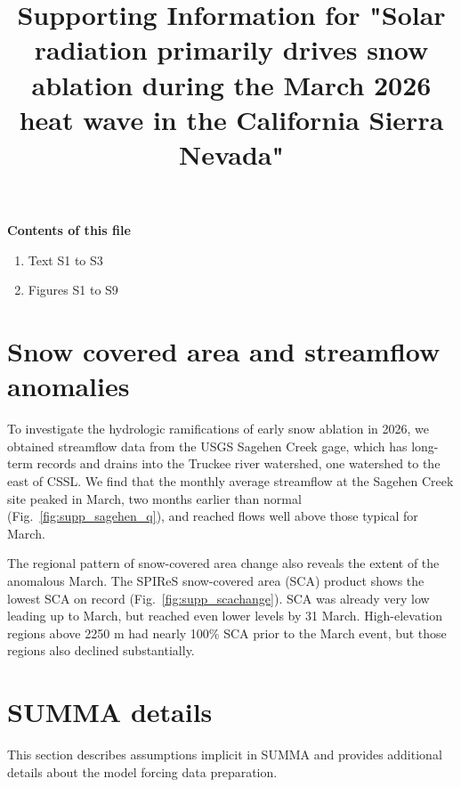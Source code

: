 \documentclass[draft,jgrga]{agutexSI2019}
\begin{document}
\title{Supporting Information for "Solar radiation primarily drives snow ablation during the March 2026 heat wave in the California Sierra Nevada"}



\begin{article}

\noindent\textbf{Contents of this file}
\begin{enumerate}
\item Text S1 to S3
\item Figures S1 to S9
\end{enumerate}

\section{Snow covered area and streamflow anomalies}
To investigate the hydrologic ramifications of early snow ablation in 2026, we obtained streamflow data from the USGS Sagehen Creek gage, which has long-term records and drains into the Truckee river watershed, one watershed to the east of CSSL. 
We find that the monthly average streamflow at the Sagehen Creek site peaked in March, two months earlier than normal (Fig.~\ref{fig:supp_sagehen_q}), and reached flows well above those typical for March.

The regional pattern of snow-covered area change also reveals the extent of the anomalous March.
The SPIReS snow-covered area (SCA) product shows the lowest SCA on record (Fig.~\ref{fig:supp_scachange}).
SCA was already very low leading up to March, but reached even lower levels by 31 March.
High-elevation regions above 2250 m had nearly 100\% SCA prior to the March event, but those regions also declined substantially.

\section{SUMMA details}\label{supp:summa_details}
This section describes assumptions implicit in SUMMA and provides additional details about the model forcing data preparation.

\end{article}
\end{document}
